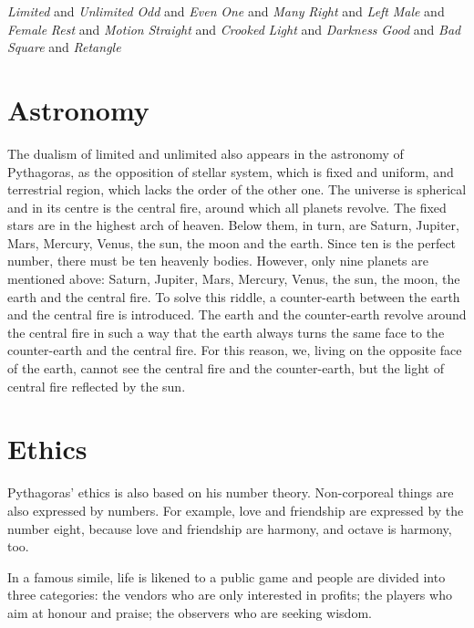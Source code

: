 \documentclass[11pt]{article}
\begin{document}
\begin{sloppypar}
\begin{center}
    \textit{Limited} and \textit{Unlimited}
    \newline
    \textit{Odd} and \textit{Even}
    \newline
    \textit{One} and \textit{Many}
    \newline
    \textit{Right} and \textit{Left}
    \newline
    \textit{Male} and \textit{Female}
    \newline
    \textit{Rest} and \textit{Motion}
    \newline
    \textit{Straight} and \textit{Crooked}
    \newline
    \textit{Light} and \textit{Darkness}
    \newline
    \textit{Good} and \textit{Bad}
    \newline
    \textit{Square} and \textit{Retangle}
\end{center}

\section{Astronomy}
The dualism of limited and unlimited also appears in the astronomy of Pythagoras, as the opposition of stellar system, which is fixed and uniform, and terrestrial region, which lacks the order of the other one. 
The universe is spherical and in its centre is the central fire, around which all planets revolve. 
The fixed stars are in the highest arch of heaven. 
Below them, in turn, are Saturn, Jupiter, Mars, Mercury, Venus, the sun, the moon and the earth. 
Since ten is the perfect number, there must be ten heavenly bodies. 
However, only nine planets are mentioned above: Saturn, Jupiter, Mars, Mercury, Venus, the sun, the moon, the earth and the central fire. 
To solve this riddle, a counter-earth between the earth and the central fire is introduced. 
The earth and the counter-earth revolve around the central fire in such a way that the earth always turns the same face to the counter-earth and the central fire. 
For this reason, we, living on the opposite face of the earth, cannot see the central fire and the counter-earth, but the light of central fire reflected by the sun.

\section{Ethics}
Pythagoras’ ethics is also based on his number theory. 
Non-corporeal things are also expressed by numbers. 
For example, love and friendship are expressed by the number eight, because love and friendship are harmony, and octave is harmony, too. 

\par

In a famous simile, life is likened to a public game and people are divided into three categories: 
the vendors who are only interested in profits; 
the players who aim at honour and praise; 
the observers who are seeking wisdom.
\end{sloppypar}
\end{document}
